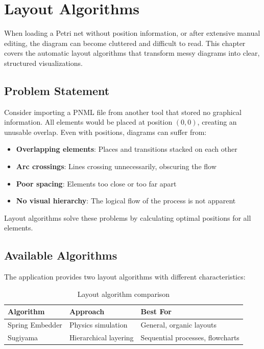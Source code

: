 \chapter{Layout Algorithms}
\label{chap:layout-algorithms}

When loading a Petri net without position information, or after extensive manual editing, the diagram can become cluttered and difficult to read. This chapter covers the automatic layout algorithms that transform messy diagrams into clear, structured visualizations.

\section{Problem Statement}
\label{sec:layout-problem}

Consider importing a PNML file from another tool that stored no graphical information. All elements would be placed at position $(0, 0)$, creating an unusable overlap. Even with positions, diagrams can suffer from:

\begin{itemize}
    \item \textbf{Overlapping elements}: Places and transitions stacked on each other
    \item \textbf{Arc crossings}: Lines crossing unnecessarily, obscuring the flow
    \item \textbf{Poor spacing}: Elements too close or too far apart
    \item \textbf{No visual hierarchy}: The logical flow of the process is not apparent
\end{itemize}

Layout algorithms solve these problems by calculating optimal positions for all elements.

\section{Available Algorithms}
\label{sec:layout-algorithms}

The application provides two layout algorithms with different characteristics:

\begin{table}[htb]
    \centering
    \begin{tabular}{lll}
        \toprule
        \textbf{Algorithm} & \textbf{Approach} & \textbf{Best For} \\
        \midrule
        Spring Embedder & Physics simulation & General, organic layouts \\
        Sugiyama & Hierarchical layering & Sequential processes, flowcharts \\
        \bottomrule
    \end{tabular}
    \caption{Layout algorithm comparison}
    \label{tab:layout-comparison}
\end{table}


